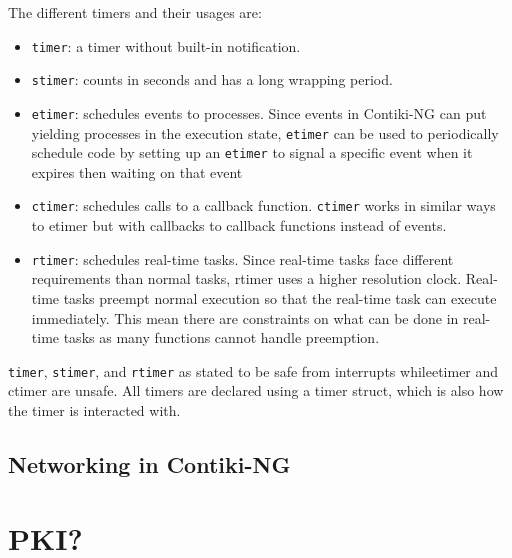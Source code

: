 \documentclass[0-thesis.tex]{subfiles}
\begin{document}
The different timers and their usages are:
\begin{itemize}
    \item \texttt{timer}: a timer without built-in notification.
    \item \texttt{stimer}: counts in seconds and has a long wrapping period.
    \item \texttt{etimer}: schedules events to processes. Since events in Contiki-NG
            can put yielding processes in the execution state, \texttt{etimer} can be
            used to periodically schedule code by setting up an \texttt{etimer} to
            signal a specific event when it expires then waiting on that event
    \item \texttt{ctimer}: schedules calls to a callback function. \texttt{ctimer}
            works in similar ways to etimer but with callbacks to callback functions
            instead of events.
    \item \texttt{rtimer}: schedules real-time tasks. Since real-time tasks face
            different requirements than normal tasks, rtimer uses a higher resolution
            clock. Real-time tasks preempt normal execution so that the real-time task can
            execute immediately. This mean there are constraints on what can be done in
            real-time tasks as many functions cannot handle preemption.
\end{itemize}

\texttt{timer}, \texttt{stimer}, and \texttt{rtimer} as stated to be safe from
interrupts whileetimer and ctimer are unsafe. All timers are declared using a timer
struct, which is also how the timer is interacted with.

\subsection{Networking in Contiki-NG}
\label{ssec:networking-contiki}


\section{PKI?}
\label{ssec:pki}
\end{document}
